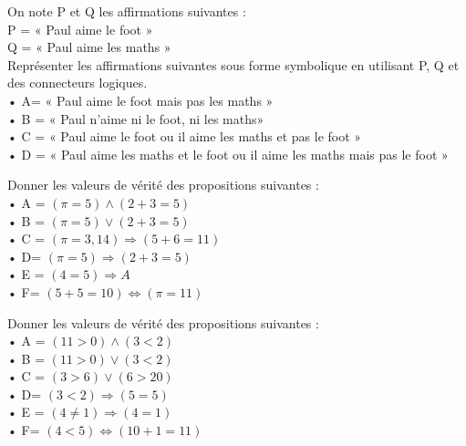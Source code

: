 \documentclass[a4paper,12pt,french]{book}
\begin{document}
\begin{exercice}[]
	 On note P et Q les affirmations suivantes :\\
	P = « Paul aime le foot »\\
	Q = « Paul aime les maths »\\
	Représenter les affirmations suivantes sous forme symbolique en utilisant P, Q et des
	connecteurs logiques.\\
	• A= « Paul aime le foot mais pas les maths »\\
	• B = « Paul n'aime ni le foot, ni les maths»\\
	• C = « Paul aime le foot ou il aime les maths et pas le foot »\\
	• D = « Paul aime les maths et le foot ou il aime les maths mais pas le foot »\\
\end{exercice}

\begin{exercice}[]
	Donner les valeurs de vérité des propositions suivantes :\\
	• A = $(\pi = 5)\wedge(2 + 3 = 5)$\\
	• B = $(\pi = 5)\vee( 2 + 3 = 5)$\\
	• C = $(\pi=3,14)\Rightarrow (5+6=11)$\\
	• D=  $(\pi=5)\Rightarrow(2 +3=5)$\\
	• E = $(4 = 5)\Rightarrow A$\\
	• F=  $(5+5=10)\Leftrightarrow(\pi=11)$
\end{exercice}

\begin{exercice}
	Donner les valeurs de vérité des propositions suivantes :\\
	• A = $(11>0)\wedge(3<2)$\\
	• B = $(11>0)\vee( 3 <2)$\\
	• C = $(3>6)\vee (6>20)$\\
	• D=  $(3<2)\Rightarrow(5=5)$\\
	• E = $(4 \neq 1)\Rightarrow (4=1)$\\
	• F=  $(4<5)\Leftrightarrow(10+1=11)$
\end{exercice}
\end{document}
